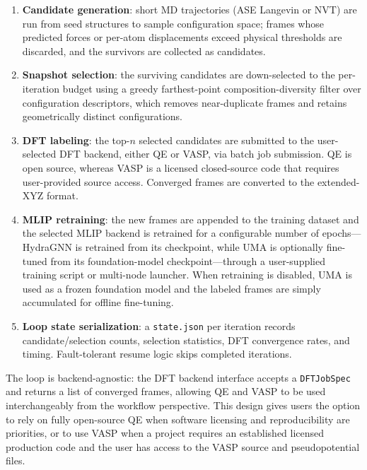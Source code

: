 \documentclass[conference]{IEEEtran}
\def\ac#1{#1}%
\def\acs#1{#1}%
\begin{document}
\begin{enumerate}
\item \textbf{Candidate generation}: short \ac{MD} trajectories (\acs{ASE} Langevin or
  \ac{NVT}) are run from seed structures to sample configuration space; frames
  whose predicted forces or per-atom displacements exceed physical thresholds
  are discarded, and the survivors are collected as candidates.
\item \textbf{Snapshot selection}: the surviving candidates are down-selected to
  the per-iteration budget using a greedy farthest-point composition-diversity
  filter over configuration descriptors, which removes near-duplicate frames and
  retains geometrically distinct configurations.
\item \textbf{\acs{DFT} labeling}: the top-$n$ selected candidates are submitted to
  the user-selected \acs{DFT} backend, either \acs{QE} or \acs{VASP}, via
  batch job submission. \acs{QE} is open source, whereas \acs{VASP} is a licensed
  closed-source code that requires user-provided source access. Converged frames
  are converted to the extended-XYZ format.
\item \textbf{\acs{MLIP} retraining}: the new frames are appended to the training
  dataset and the selected \acs{MLIP} backend is retrained for a configurable
  number of epochs---HydraGNN is retrained from its checkpoint, while UMA is
  optionally fine-tuned from its foundation-model checkpoint---through a
  user-supplied training script or multi-node launcher. When retraining is
  disabled, UMA is used as a frozen foundation model and the labeled frames are
  simply accumulated for offline fine-tuning.
\item \textbf{Loop state serialization}: a \texttt{state.json} per iteration
  records candidate/selection counts, selection statistics, \acs{DFT} convergence rates,
  and timing. Fault-tolerant resume logic skips completed iterations.
\end{enumerate}

The loop is backend-agnostic: the \acs{DFT} backend interface accepts a
\texttt{DFTJobSpec} and returns a list of converged frames, allowing \acs{QE} and
\acs{VASP} to be used interchangeably from the workflow perspective. This design gives
users the option to rely on fully open-source \acs{QE} when software licensing and
reproducibility are priorities, or to use \acs{VASP} when a project requires an
established licensed production code and the user has access to the \acs{VASP} source
and pseudopotential files.
\end{document}

